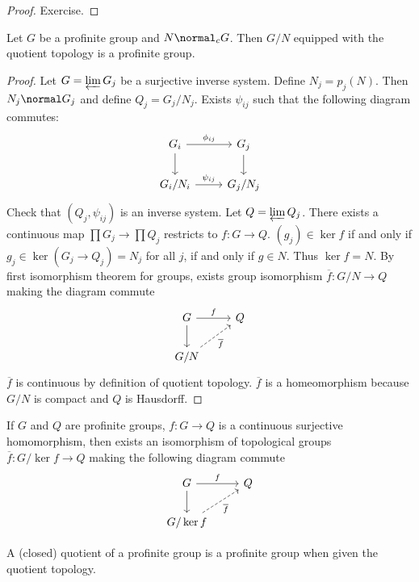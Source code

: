 \documentclass[a4paper]{article}
\begin{document}
\begin{proof}
  Exercise.
\end{proof}

\begin{proposition}
  Let \(G\) be a profinite group and \(N \normal_c G\). Then \(G/N\) equipped with the quotient topology is a profinite group.
\end{proposition}

\begin{proof}
  Let \(G = \varprojlim G_j\) be a surjective inverse system. Define \(N_j = p_j(N)\). Then \(N_j \normal G_j\) and define \(Q_j = G_j/N_j\). Exists \(\psi_{ij}\) such that the following diagram commutes:
  \[
    \begin{tikzcd}
      G_i \ar[r, "\phi_{ij}"] \ar[d] & G_j \ar[d] \\
      G_i/N_i \ar[r, "\psi_{ij}"] & G_j/N_j
    \end{tikzcd}
  \]
  Check that \((Q_j, \psi_{ij})\) is an inverse system. Let \(Q = \varprojlim Q_j\). There exists a continuous map \(\prod G_j \to \prod Q_j\) restricts to \(f: G \to Q\). \((g_j) \in \ker f\) if and only if \(g_j \in \ker (G_j \to Q_j) = N_j\) for all \(j\), if and only if \(g \in N\). Thus \(\ker f = N\). By first isomorphism theorem for groups, exists group isomorphism \(\overline f: G/N \to Q\) making the diagram commute
  \[
    \begin{tikzcd}
      G \ar[r, "f"] \ar[d] & Q \\
      G/N \ar[ur, "\overline f"', dashed]
    \end{tikzcd}
  \]
  \(\overline f\) is continuous by definition of quotient topology. \(\overline f\) is a homeomorphism because \(G/N\) is compact and \(Q\) is Hausdorff.
\end{proof}

\begin{theorem}
  If \(G\) and \(Q\) are profinite groups, \(f: G \to Q\) is a continuous surjective homomorphism, then exists an isomorphism of topological groups \(\overline f: G/\ker f \to Q\) making the following diagram commute
  \[
    \begin{tikzcd}
      G \ar[r, "f"] \ar[d] & Q \\
      G/\ker f \ar[ur, "\overline f"', dashed]
    \end{tikzcd}
  \]
\end{theorem}

\begin{corollary}
  A (closed) quotient of a profinite group is a profinite group when given the quotient topology.
\end{corollary}
\end{document}
